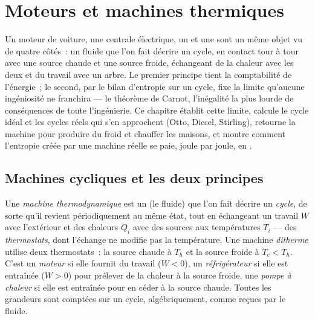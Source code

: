 \chapter{Moteurs et machines thermiques}\label{ch:b1:heat-engines}

Un moteur de voiture, une centrale électrique, un  et une
 sont un même objet vu de quatre côtés~: un fluide que l'on
fait décrire un cycle, en contact tour à tour avec une source chaude et une
source froide, échangeant de la chaleur avec les deux et du travail avec un
arbre. Le premier principe tient la comptabilité de l'énergie~; le second,
par le bilan d'entropie sur un cycle, fixe la limite qu'aucune ingéniosité
ne franchira --- le théorème de Carnot, l'inégalité la plus lourde de
conséquences de toute l'ingénierie. Ce chapitre établit cette limite,
calcule le cycle idéal et les cycles réels qui s'en approchent (Otto,
Diesel, Stirling), retourne la machine pour produire du froid et chauffer
les maisons, et montre comment l'entropie créée par une machine réelle se
paie, joule par joule, en .

\section{Machines cycliques et les deux principes}

\begin{definition}\label{def:b1:heat-engines:machine}
Une \emph{machine thermodynamique} est un  (le fluide) que
l'on fait décrire un \emph{cycle}, de sorte qu'il revient périodiquement au
même état, tout en échangeant un travail $W$ avec l'extérieur et des
chaleurs $Q_i$ avec des sources aux températures $T_i$ --- des
\emph{thermostats}, dont l'échange ne modifie pas la température. Une
machine \emph{ditherme} utilise deux thermostats~: la source chaude à
$T_h$ et la source froide à $T_c < T_h$. C'est un \emph{moteur} si elle
fournit du travail ($W < 0$), un \emph{réfrigérateur} si elle est entraînée
($W > 0$) pour prélever de la chaleur à la source froide, une \emph{pompe
à chaleur} si elle est entraînée pour en céder à la source chaude. Toutes
les grandeurs sont comptées sur un cycle, algébriquement, comme reçues par le fluide.
\end{definition}


